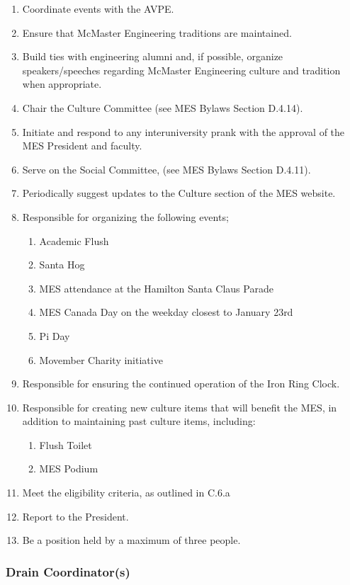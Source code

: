 \begin{enumerate}
 \item
  Coordinate events with the AVPE.
 \item
  Ensure that McMaster Engineering traditions are maintained.
 \item
  Build ties with engineering alumni and, if possible, organize
  speakers/speeches regarding McMaster Engineering culture and tradition
  when appropriate.
 \item
  Chair the Culture Committee (see MES Bylaws Section D.4.14).
 \item
  Initiate and respond to any interuniversity prank with the approval of
  the MES President and faculty.
 \item
  Serve on the Social Committee, (see MES Bylaws Section D.4.11).
 \item
  Periodically suggest updates to the Culture section of the MES
  website.
 \item
  Responsible for organizing the following events;

  \begin{enumerate}
   \item
    Academic Flush
   \item
    Santa Hog
   \item
    MES attendance at the Hamilton Santa Claus Parade
   \item
    MES Canada Day on the weekday closest to January 23rd
   \item
    Pi Day
   \item
    Movember Charity initiative
  \end{enumerate}
 \item
  Responsible for ensuring the continued operation of the Iron Ring
  Clock.
 \item
  Responsible for creating new culture items that will benefit the MES,
  in addition to maintaining past culture items, including:

  \begin{enumerate}
   \item
    Flush Toilet
   \item
    MES Podium
  \end{enumerate}
 \item
  Meet the eligibility criteria, as outlined in C.6.a
 \item
  Report to the President.
 \item
  Be a position held by a maximum of three people.

\end{enumerate}
\hypertarget{drain-coordinators}{%
 \subsubsection{Drain Coordinator(s)}
 \label{drain-coordinators}}

